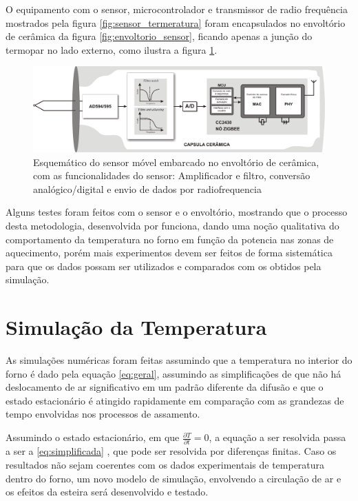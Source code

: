 O equipamento com o sensor, microcontrolador e transmissor de radio frequência mostrados pela figura \ref{fig:sensor_termeratura} foram encapsulados no envoltório de cerâmica da figura \ref{fig:envoltorio_sensor}, ficando apenas a junção do termopar no lado externo, como ilustra a figura \ref{fig:sensor_movel}.

\begin{figure}[H]
\centering
\includegraphics[width=\textwidth]{Figuras/sensor_movel}
\caption{Esquemático do sensor móvel embarcado no envoltório de cerâmica, com as funcionalidades do sensor: Amplificador e filtro, conversão analógico/digital e envio de dados por radiofrequencia}
\label{fig:sensor_movel}
\end{figure}

Alguns testes foram feitos com o sensor e o envoltório, mostrando que o processo desta metodologia, desenvolvida por \citet{arthur} funciona, dando uma noção qualitativa do comportamento da temperatura no forno em função da potencia nas zonas de aquecimento, porém mais experimentos devem ser feitos de forma sistemática para que os dados possam ser utilizados e comparados com os obtidos pela simulação. 
 
\section{Simulação da Temperatura}\label{simulação-temperatura}
 
As simulações numéricas foram feitas assumindo que a temperatura no interior do forno é dado pela equação \ref{eq:geral}, assumindo as simplificações de que não há deslocamento de ar significativo em um padrão diferente da difusão e que o estado estacionário é atingido rapidamente em comparação com as grandezas de tempo envolvidas nos processos de assamento. 

Assumindo o estado estacionário, em que $\frac{\partial T}{\partial t} = 0$, a equação a ser resolvida passa a ser a \ref{eq:simplificada} , que pode ser resolvida por diferenças finitas. Caso os resultados não sejam coerentes com os dados experimentais de temperatura dentro do forno, um novo modelo de simulação, envolvendo a circulação de ar e os efeitos da esteira será desenvolvido e testado.


